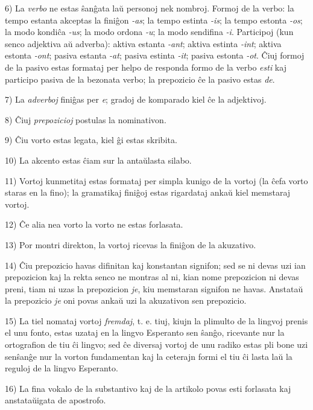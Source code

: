 6) La \emph{verbo} ne estas \^san\^gata la\u u personoj nek nombroj. Formoj
de la verbo: la tempo estanta akceptas la fini\^gon \emph{-as}; la
tempo estinta \emph{-is}; la tempo estonta \emph{-os}; la modo kondi\^ca
\emph{-us}; la modo ordona \emph{-u}; la modo sendifina \emph{-i}. Participoj
(kun senco adjektiva a\u u adverba): aktiva estanta \emph{-ant}; aktiva
estinta \emph{-int}; aktiva estonta \emph{-ont}; pasiva estanta \emph{-at};
pasiva estinta \emph{-it}; pasiva estonta \emph{-ot}. \^Ciuj formoj de la
pasivo estas formataj per helpo de responda formo de la verbo
\emph{esti} kaj participo pasiva de la bezonata verbo; la prepozicio
\^ce la pasivo estas \emph{de}.

7) La \emph{adverboj} fini\^gas per \emph{e}; gradoj de komparado kiel \^ce la
adjektivoj.

8) \^Ciuj \emph{prepozicioj} postulas la nominativon.

9) \^Ciu vorto estas legata, kiel \^gi estas skribita.

10) La akcento estas \^ciam sur la anta\u ulasta silabo.

11) Vortoj kunmetitaj estas formataj per simpla kunigo de la vortoj
(la \^cefa vorto staras en la fino); la gramatikaj fini\^goj estas
rigardataj anka\u u kiel memstaraj vortoj.

12) \^Ce alia nea vorto la vorto ne estas forlasata.

13) Por montri direkton, la vortoj ricevas la fini\^gon de la
akuzativo.

14) \^Ciu prepozicio havas difinitan kaj konstantan signifon; sed se
ni devas uzi ian prepozicion kaj la rekta senco ne montras al ni,
kian nome prepozicion ni devas preni, tiam ni uzas la prepozicion
\emph{je}, kiu memstaran signifon ne havas. Anstata\u u la prepozicio
\emph{je} oni povas anka\u u uzi la akuzativon sen prepozicio.

15) La tiel nomataj vortoj \emph{fremdaj}, t. e. tiuj, kiujn la plimulto
de la lingvoj prenis el unu fonto, estas uzataj en la lingvo
Esperanto sen \^san\^go, ricevante nur la ortografion de tiu \^ci
lingvo; sed \^ce diversaj vortoj de unu radiko estas pli bone uzi
sen\^san\^ge nur la vorton fundamentan kaj la ceterajn formi el tiu
\^ci lasta la\u u la reguloj de la lingvo Esperanto.

16) La fina vokalo de la substantivo kaj de la artikolo povas esti
forlasata kaj anstata\u uigata de apostrofo.

\smallrule{}
